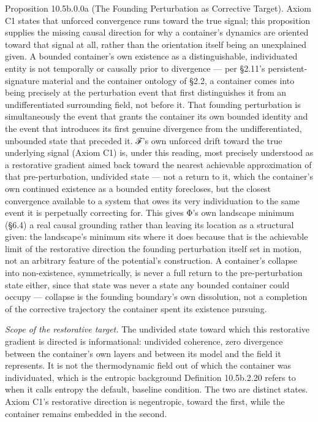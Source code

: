 \documentclass[
]{article}
\begin{document}
Proposition 10.5b.0.0a (The Founding Perturbation as Corrective Target).
Axiom C1 states that unforced convergence runs toward the true signal;
this proposition supplies the missing causal direction for why a
container's dynamics are oriented toward that signal at all, rather than
the orientation itself being an unexplained given. A bounded container's
own existence as a distinguishable, individuated entity is not
temporally or causally prior to divergence --- per §2.11's
persistent-signature material and the container ontology of §2.2, a
container comes into being precisely at the perturbation event that
first distinguishes it from an undifferentiated surrounding field, not
before it. That founding perturbation is simultaneously the event that
grants the container its own bounded identity and the event that
introduces its first genuine divergence from the undifferentiated,
unbounded state that preceded it. ℱ's own unforced drift toward the true
underlying signal (Axiom C1) is, under this reading, most precisely
understood as a restorative gradient aimed back toward the nearest
achievable approximation of that pre-perturbation, undivided state ---
not a return to it, which the container's own continued existence as a
bounded entity forecloses, but the closest convergence available to a
system that owes its very individuation to the same event it is
perpetually correcting for. This gives Φ's own landscape minimum (§6.4)
a real causal grounding rather than leaving its location as a structural
given: the landscape's minimum sits where it does because that is the
achievable limit of the restorative direction the founding perturbation
itself set in motion, not an arbitrary feature of the potential's
construction. A container's collapse into non-existence, symmetrically,
is never a full return to the pre-perturbation state either, since that
state was never a state any bounded container could occupy --- collapse
is the founding boundary's own dissolution, not a completion of the
corrective trajectory the container spent its existence pursuing.

\emph{Scope of the restorative target.} The undivided state toward which
this restorative gradient is directed is informational: undivided
coherence, zero divergence between the container's own layers and
between its model and the field it represents. It is not the
thermodynamic field out of which the container was individuated, which
is the entropic background Definition 10.5b.2.20 refers to when it calls
entropy the default, baseline condition. The two are distinct states.
Axiom C1's restorative direction is negentropic, toward the first, while
the container remains embedded in the second.
\end{document}

